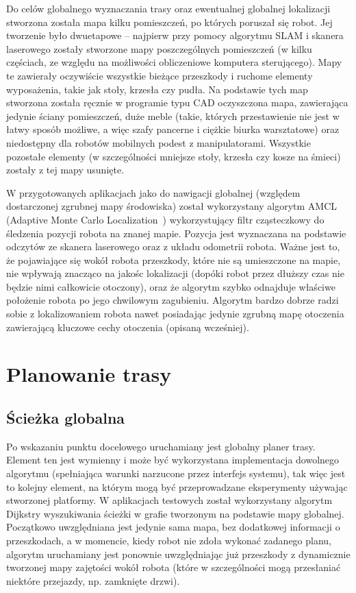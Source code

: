 Do celów globalnego wyznaczania trasy oraz ewentualnej globalnej lokalizacji stworzona
została mapa kilku pomieszczeń, po których poruszał się robot. Jej tworzenie było
dwuetapowe -- najpierw przy pomocy algorytmu SLAM i skanera laserowego zostały
stworzone mapy poszczególnych pomieszczeń (w kilku częściach, ze względu na możliwości
obliczeniowe komputera sterującego). Mapy te zawierały oczywiście wszystkie bieżące
przeszkody i ruchome elementy wyposażenia, takie jak stoły, krzesła czy pudła.
Na podstawie tych map stworzona została ręcznie w programie typu CAD oczyszczona
mapa, zawierająca jedynie ściany pomieszczeń, duże meble (takie, których przestawienie
nie jest w łatwy sposób możliwe, a więc szafy pancerne i ciężkie biurka warsztatowe)
oraz niedostępny dla robotów mobilnych podest z manipulatorami. Wszystkie pozostałe
elementy (w szczególności mniejsze stoły, krzesła czy kosze na śmieci) zostały z tej
mapy usunięte.

W przygotowanych aplikacjach jako do nawigacji globalnej (względem dostarczonej
zgrubnej mapy środowiska) został wykorzystany algorytm AMCL (Adaptive Monte Carlo
Localization~\cite{fox2001kld}) wykorzystujący filtr cząsteczkowy do śledzenia
pozycji robota na znanej mapie. Pozycja jest wyznaczana na podstawie odczytów
ze skanera laserowego oraz z układu odometrii robota. Ważne jest to, że pojawiające
się wokół robota przeszkody, które nie są umieszczone na mapie, nie wpływają znacząco
na jakośc lokalizacji (dopóki robot przez dłuższy czas nie będzie nimi całkowicie
otoczony), oraz że algorytm szybko odnajduje właściwe położenie robota po jego
chwilowym zagubieniu. Algorytm bardzo dobrze radzi sobie z lokalizowaniem robota nawet
posiadając jedynie zgrubną mapę otoczenia zawierającą kluczowe cechy otoczenia
(opisaną wcześniej).

\section{Planowanie trasy}

\subsection{Ścieżka globalna}

Po wskazaniu punktu docelowego uruchamiany jest globalny planer trasy. Element ten
jest wymienny i może być wykorzystana implementacja dowolnego algorytmu (spełniająca
warunki narzucone przez interfejs systemu), tak więc jest to kolejny element, na którym
mogą być przeprowadzane eksperymenty używając stworzonej platformy. W aplikacjach
testowych został wykorzystany algorytm Dijkstry wyszukiwania ścieżki w grafie tworzonym
na podstawie mapy globalnej. Początkowo uwzględniana jest jedynie sama mapa, bez
dodatkowej informacji o przeszkodach, a w momencie, kiedy robot nie zdoła wykonać
zadanego planu, algorytm uruchamiany jest ponownie uwzględniając już przeszkody
z dynamicznie tworzonej mapy zajętości wokół robota (które w szczególności mogą
przesłaniać niektóre przejazdy, np. zamknięte drzwi).

